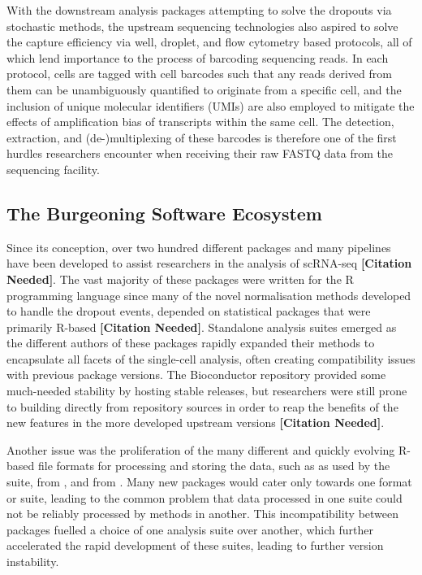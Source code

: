 \documentclass[a4paper,num-refs]{oup-contemporary}
\newcommand{\citeneed}{{\bf\tiny [Citation Needed]}}
\begin{document}
With the downstream analysis packages attempting to solve the dropouts via stochastic methods, the upstream sequencing technologies also aspired to solve the capture efficiency via well, droplet, and flow cytometry based protocols, all of which lend importance to the process of barcoding sequencing reads. In each protocol, cells are tagged with cell barcodes such that any reads derived from them can be unambiguously quantified to originate from a specific cell, and the inclusion of unique molecular identifiers (UMIs) are also employed to mitigate the effects of amplification bias of transcripts within the same cell. The detection, extraction, and (de-)multiplexing of these barcodes is therefore one of the first hurdles researchers encounter when receiving their raw FASTQ data from the sequencing facility.

\subsection{The Burgeoning Software Ecosystem}
Since its conception, over two hundred different packages and many pipelines have been developed to assist researchers in the analysis of scRNA-seq \citeneed. The vast majority of these packages were written for the R programming language since many of the novel normalisation methods developed to handle the dropout events, depended on statistical packages that were primarily R-based \citeneed. Standalone analysis suites emerged as the different authors of these packages rapidly expanded their methods to encapsulate all facets of the single-cell analysis, often creating compatibility issues with previous package versions. The Bioconductor repository provided some much-needed stability by hosting stable releases, but researchers were still prone to building directly from repository sources in order to reap the benefits of the new features in the more developed upstream versions \citeneed.

Another issue was the proliferation of the many different and quickly evolving R-based file formats for processing and storing the data, such as  as used by the  suite,  from , and  from  \citep{lun2018singlecellexperiment,mccarthy2017scater,grun2015raceid,satija2015seurat}. Many new packages would cater only towards one format or suite, leading to the common problem that data processed in one suite could not be reliably processed by methods in another. This incompatibility between packages fuelled a choice of one analysis suite over another, which further accelerated the rapid development of these suites, leading to further version instability.
\end{document}
